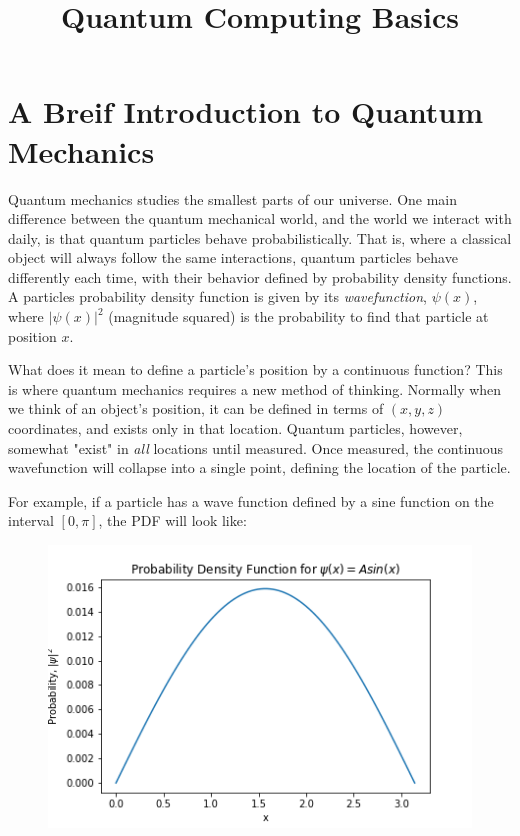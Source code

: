 \documentclass[11pt]{article}
\title{Quantum Computing Basics}
\makeatletter
\def\maxwidth{\ifdim\Gin@nat@width>\linewidth\linewidth
    \else\Gin@nat@width\fi}
\let\Oldincludegraphics\includegraphics
\renewcommand{\includegraphics}[1]{\Oldincludegraphics[width=.8\maxwidth]{#1}}
\makeatother
\begin{document}
    
    
    \maketitle
    
    

    
    \section{A Breif Introduction to Quantum
Mechanics}\label{a-breif-introduction-to-quantum-mechanics}

    Quantum mechanics studies the smallest parts of our universe. One main
difference between the quantum mechanical world, and the world we
interact with daily, is that quantum particles behave probabilistically.
That is, where a classical object will always follow the same
interactions, quantum particles behave differently each time, with their
behavior defined by probability density functions. A particles
probability density function is given by its \emph{wavefunction},
\(\psi(x)\), where \(|\psi(x)|^2\) (magnitude squared) is the
probability to find that particle at position \(x\).

What does it mean to define a particle's position by a continuous
function? This is where quantum mechanics requires a new method of
thinking. Normally when we think of an object's position, it can be
defined in terms of \((x, y, z)\) coordinates, and exists only in that
location. Quantum particles, however, somewhat "exist" in \emph{all}
locations until measured. Once measured, the continuous wavefunction
will collapse into a single point, defining the location of the
particle.

For example, if a particle has a wave function defined by a sine
function on the interval \([0, \pi]\), the PDF will look like:

\begin{figure}
\centering
\includegraphics{images/sin_pdf.png}
\caption{}
\end{figure}
\end{document}
